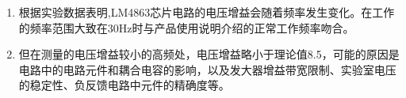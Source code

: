 \documentclass[dvipsnames, svgnames,a4paper,11pt]{article}
\begin{document}
\begin{enumerate}
	\item 根据实验数据表明,LM4863芯片电路的电压增益会随着频率发生变化。在工作的频率范围大致在30Hz时与产品使用说明介绍的正常工作频率吻合。
	\item 但在测量的电压增益较小的高频处，电压增益略小于理论值8.5，可能的原因是电路中的电路元件和耦合电容的影响，以及发大器增益带宽限制、实验室电压的稳定性、负反馈电路中元件的精确度等。
\end{enumerate}
		

\clearpage
{}




\end{document}
